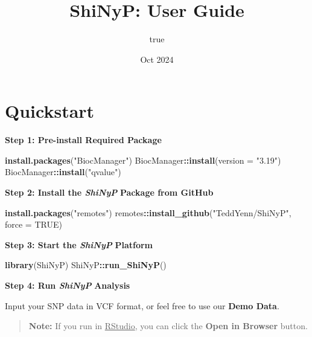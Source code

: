\documentclass[
]{book}
\title{ShiNyP: User Guide}
\author{true}
\date{Oct 2024}
\newenvironment{Shaded}{\begin{snugshade}}{\end{snugshade}}
\newcommand{\AttributeTok}[1]{\textcolor[rgb]{0.13,0.29,0.53}{#1}}
\newcommand{\ConstantTok}[1]{\textcolor[rgb]{0.56,0.35,0.01}{#1}}
\newcommand{\FunctionTok}[1]{\textcolor[rgb]{0.13,0.29,0.53}{\textbf{#1}}}
\newcommand{\NormalTok}[1]{#1}
\newcommand{\SpecialCharTok}[1]{\textcolor[rgb]{0.81,0.36,0.00}{\textbf{#1}}}
\newcommand{\StringTok}[1]{\textcolor[rgb]{0.31,0.60,0.02}{#1}}
\begin{document}
\maketitle

{
\setcounter{tocdepth}{1}
\tableofcontents
}
\chapter{Quickstart}\label{quickstart}

\textbf{Step 1: Pre-install Required Package}

\begin{Shaded}
\begin{Highlighting}[]
\FunctionTok{install.packages}\NormalTok{(}\StringTok{"BiocManager"}\NormalTok{)}
\NormalTok{BiocManager}\SpecialCharTok{::}\FunctionTok{install}\NormalTok{(}\AttributeTok{version =} \StringTok{"3.19"}\NormalTok{)}
\NormalTok{BiocManager}\SpecialCharTok{::}\FunctionTok{install}\NormalTok{(}\StringTok{"qvalue"}\NormalTok{)}
\end{Highlighting}
\end{Shaded}

\textbf{Step 2: Install the {\emph{ShiNyP}}} \textbf{Package from GitHub}

\begin{Shaded}
\begin{Highlighting}[]
\FunctionTok{install.packages}\NormalTok{(}\StringTok{"remotes"}\NormalTok{) }
\NormalTok{remotes}\SpecialCharTok{::}\FunctionTok{install\_github}\NormalTok{(}\StringTok{"TeddYenn/ShiNyP"}\NormalTok{, }\AttributeTok{force =} \ConstantTok{TRUE}\NormalTok{)}
\end{Highlighting}
\end{Shaded}

\textbf{Step 3: Start the {\emph{ShiNyP}}} \textbf{Platform}

\begin{Shaded}
\begin{Highlighting}[]
\FunctionTok{library}\NormalTok{(ShiNyP)}
\NormalTok{ShiNyP}\SpecialCharTok{::}\FunctionTok{run\_ShiNyP}\NormalTok{()}
\end{Highlighting}
\end{Shaded}

\textbf{Step 4: Run {\emph{ShiNyP}}} \textbf{Analysis}

Input your SNP data in VCF format, or feel free to use our {\textbf{Demo Data}}.

\begin{quote}
\textbf{Note:} If you run in \ul{RStudio}, you can click the {\textbf{Open in Browser}} button.
\end{quote}
\end{document}

